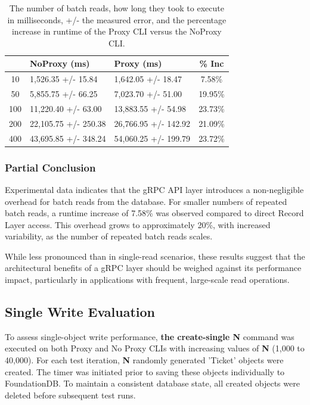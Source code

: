 \documentclass[sigconf]{acmart}
\begin{document}
\begin{table}[h]
\begin{tabular}{|c|l|l|c|}
    \hline
    \rowcolor[HTML]{656565} 
    \multicolumn{1}{|c}{\cellcolor[HTML]{656565}{\color[HTML]{FFFFFF} \textbf{N}}} &
    {\color[HTML]{FFFFFF} \textbf{NoProxy (ms)}} &
    {\color[HTML]{FFFFFF} \textbf{Proxy (ms)}} &
    {\color[HTML]{FFFFFF} \textbf{\% Inc}} \\ \hline
    10  & 1,526.35 +/- 15.84   & 1,642.05 +/- 18.47   & 7.58\%  \\
    \rowcolor[HTML]{EFEFEF} 
    50  & 5,855.75 +/- 66.25   & 7,023.70 +/- 51.00   & 19.95\% \\
    100 & 11,220.40 +/- 63.00  & 13,883.55 +/- 54.98  & 23.73\% \\
    \rowcolor[HTML]{EFEFEF} 
    200 & 22,105.75 +/- 250.38 & 26,766.95 +/- 142.92 & 21.09\% \\
    400 & 43,695.85 +/- 348.24 & 54,060.25 +/- 199.79 & 23.72\% \\ \hline
\end{tabular}
\caption{The number of batch reads, how long they took to execute in milliseconds, +/- the measured error, and the percentage increase in runtime of the Proxy CLI versus the NoProxy CLI.}
\end{table}

\subsubsection{Partial Conclusion}

Experimental data indicates that the gRPC API layer introduces a non-negligible overhead for batch reads from the database.
For smaller numbers of repeated batch reads, a runtime increase of 7.58\% was observed compared to direct Record Layer access.
This overhead grows to approximately 20\%, with increased variability, as the number of repeated batch reads scales.

While less pronounced than in single-read scenarios, these results suggest that the architectural benefits of a gRPC layer should be weighed against its performance impact, particularly in applications with frequent, large-scale read operations.

\subsection{Single Write Evaluation}

To assess single-object write performance, \textbf{the create-single N} command was executed on both Proxy and No Proxy CLIs with increasing values of \textbf{N} (1,000 to 40,000).
For each test iteration, \textbf{N} randomly generated 'Ticket' objects were created.
The timer was initiated prior to saving these objects individually to FoundationDB.
To maintain a consistent database state, all created objects were deleted before subsequent test runs.
\end{document}
